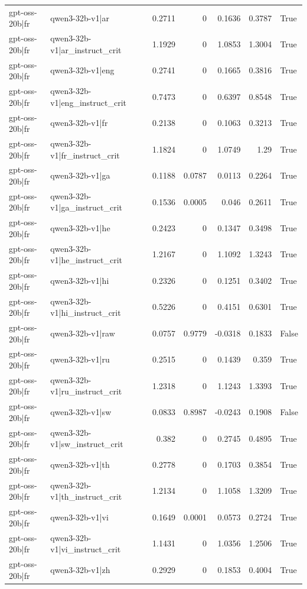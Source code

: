 \begin{table}
\begin{tabular}{l l r r r r l}
gpt-oss-20b|fr & qwen3-32b-v1|ar & 0.2711 & 0 & 0.1636 & 0.3787 & True \\
gpt-oss-20b|fr & qwen3-32b-v1|ar_instruct_crit & 1.1929 & 0 & 1.0853 & 1.3004 & True \\
gpt-oss-20b|fr & qwen3-32b-v1|eng & 0.2741 & 0 & 0.1665 & 0.3816 & True \\
gpt-oss-20b|fr & qwen3-32b-v1|eng_instruct_crit & 0.7473 & 0 & 0.6397 & 0.8548 & True \\
gpt-oss-20b|fr & qwen3-32b-v1|fr & 0.2138 & 0 & 0.1063 & 0.3213 & True \\
gpt-oss-20b|fr & qwen3-32b-v1|fr_instruct_crit & 1.1824 & 0 & 1.0749 & 1.29 & True \\
gpt-oss-20b|fr & qwen3-32b-v1|ga & 0.1188 & 0.0787 & 0.0113 & 0.2264 & True \\
gpt-oss-20b|fr & qwen3-32b-v1|ga_instruct_crit & 0.1536 & 0.0005 & 0.046 & 0.2611 & True \\
gpt-oss-20b|fr & qwen3-32b-v1|he & 0.2423 & 0 & 0.1347 & 0.3498 & True \\
gpt-oss-20b|fr & qwen3-32b-v1|he_instruct_crit & 1.2167 & 0 & 1.1092 & 1.3243 & True \\
gpt-oss-20b|fr & qwen3-32b-v1|hi & 0.2326 & 0 & 0.1251 & 0.3402 & True \\
gpt-oss-20b|fr & qwen3-32b-v1|hi_instruct_crit & 0.5226 & 0 & 0.4151 & 0.6301 & True \\
gpt-oss-20b|fr & qwen3-32b-v1|raw & 0.0757 & 0.9779 & -0.0318 & 0.1833 & False \\
gpt-oss-20b|fr & qwen3-32b-v1|ru & 0.2515 & 0 & 0.1439 & 0.359 & True \\
gpt-oss-20b|fr & qwen3-32b-v1|ru_instruct_crit & 1.2318 & 0 & 1.1243 & 1.3393 & True \\
gpt-oss-20b|fr & qwen3-32b-v1|sw & 0.0833 & 0.8987 & -0.0243 & 0.1908 & False \\
gpt-oss-20b|fr & qwen3-32b-v1|sw_instruct_crit & 0.382 & 0 & 0.2745 & 0.4895 & True \\
gpt-oss-20b|fr & qwen3-32b-v1|th & 0.2778 & 0 & 0.1703 & 0.3854 & True \\
gpt-oss-20b|fr & qwen3-32b-v1|th_instruct_crit & 1.2134 & 0 & 1.1058 & 1.3209 & True \\
gpt-oss-20b|fr & qwen3-32b-v1|vi & 0.1649 & 0.0001 & 0.0573 & 0.2724 & True \\
gpt-oss-20b|fr & qwen3-32b-v1|vi_instruct_crit & 1.1431 & 0 & 1.0356 & 1.2506 & True \\
gpt-oss-20b|fr & qwen3-32b-v1|zh & 0.2929 & 0 & 0.1853 & 0.4004 & True \\

\end{tabular}
\end{table}
